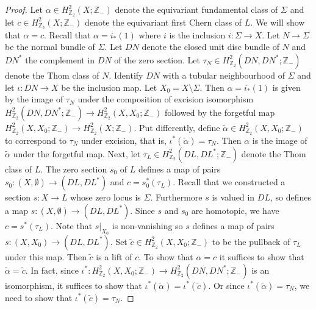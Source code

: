 \documentclass{amsart}
\theoremstyle{definition}
\theoremstyle{remark}
\numberwithin{equation}{section}
\begin{document}
\begin{proof}
Let $\alpha \in H^2_{\mathbb{Z}_2}(X ; \mathbb{Z}_-)$ denote the equivariant fundamental class of $\Sigma$ and let $c \in H^2_{\mathbb{Z}_2}(X ; \mathbb{Z}_-)$ denote the equivariant first Chern class of $L$. We will show that $\alpha = c$. Recall that $\alpha = i_*(1)$ where $i$ is the inclusion $i : \Sigma \to X$. Let $N \to \Sigma$ be the normal bundle of $\Sigma$. Let $DN$ denote the closed unit disc bundle of $N$ and $DN^*$ the complement in $DN$ of the zero section. Let $\tau_N \in H^2_{\mathbb{Z}_2}( DN , DN^* ; \mathbb{Z}_-)$ denote the Thom class of $N$. Identify $DN$ with a tubular neighbourhood of $\Sigma$ and let $\iota : DN \to X$ be the inclusion map. Let $X_0 = X \setminus \Sigma$. Then $\alpha = i_*(1)$ is given by the image of $\tau_N$ under the composition of excision isomorphism $H^2_{\mathbb{Z}_2}(DN , DN^* ; \mathbb{Z}_-) \to H^2_{\mathbb{Z}_2}(X , X_0 ; \mathbb{Z}_-)$ followed by the forgetful map $H^2_{\mathbb{Z}_2}(X , X_0 ; \mathbb{Z}_-) \to H^2_{\mathbb{Z}_2}(X ; \mathbb{Z}_-)$. Put differently, define $\widetilde{\alpha} \in H^2_{\mathbb{Z}_2}(X , X_0 ; \mathbb{Z}_-)$ to correspond to $\tau_N$ under excision, that is, $\iota^*(\widetilde{\alpha}) = \tau_N$. Then $\alpha$ is the image of $\widetilde{\alpha}$ under the forgetful map. Next, let $\tau_L \in H^2_{\mathbb{Z}_2}(DL , DL^* ; \mathbb{Z}_-)$ denote the Thom class of $L$. The zero section $s_0$ of $L$ defines a map of pairs $s_0 : (X , \emptyset) \to (DL,DL^*)$ and $c = s_0^*(\tau_L)$. Recall that we constructed a section $s : X \to L$ whose zero locus is $\Sigma$. Furthermore $s$ is valued in $DL$, so defines a map $s : (X  , \emptyset) \to (DL,DL^*)$. Since $s$ and $s_0$ are homotopic, we have $c = s^*(\tau_L)$. Note that $s|_{X_0}$ is non-vanishing so $s$ defines a map of pairs $s : (X,X_0) \to (DL , DL^*)$. Set $\widetilde{c} \in H^2_{\mathbb{Z}_2}(X , X_0 ; \mathbb{Z}_-)$ to be the pullback of $\tau_L$ under this map. Then $\widetilde{c}$ is a lift of $c$. To show that $\alpha = c$ it suffices to show that $\widetilde{\alpha} = \widetilde{c}$. In fact, since $\iota^* : H^2_{\mathbb{Z}_2}( X , X_0 ; \mathbb{Z}_-) \to H^2_{\mathbb{Z}_2}( DN , DN^* ; \mathbb{Z}_-)$ is an isomorphism, it suffices to show that $\iota^*(\widetilde{\alpha}) = \iota^*(\widetilde{c})$. Or since $\iota^*(\widetilde{\alpha}) = \tau_N$, we need to show that $\iota^*(\widetilde{c}) = \tau_N$.


\end{proof}
\end{document}

